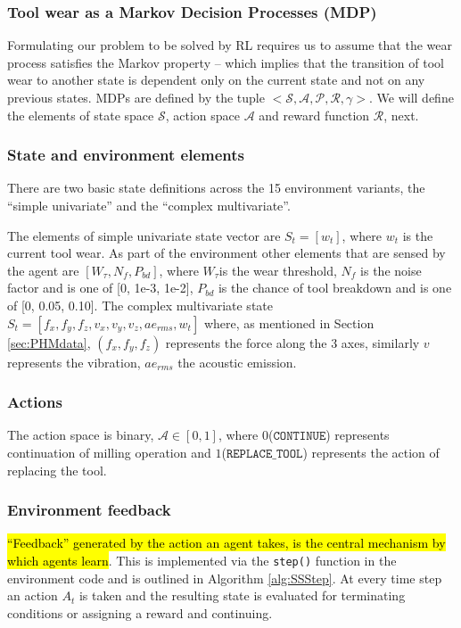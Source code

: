 \documentclass[a4paper, 12pt]{article}
\newcommand{\hlc}[2][cyan!10]{{\colorlet{foo}{#1} \sethlcolor{foo}\hl{#2}}}
\begin{document}
\subsubsection*{Tool wear as a Markov Decision Processes (MDP)}
Formulating our problem to be solved by RL requires us to assume that the wear process satisfies the Markov property -- which implies that the transition of tool wear to another state is dependent only on the current state and not on any previous states. MDPs are defined by the tuple $<\mathcal{S, A, P, R, \gamma}>$. We will define the elements of state space $\mathcal{S}$, action space $\mathcal{A}$ and reward function $\mathcal{R}$, next.

\subsubsection*{State and environment elements}
There are two basic state definitions across the 15 environment variants, the ``simple univariate'' and the ``complex multivariate''. 

The elements of simple univariate state vector are $S_t = [w_t]$, where $w_t$ is the current tool wear. As part of the environment other elements that are sensed by the agent are $[W_\tau, N_f, P_{bd}]$, where $W_\tau$is the wear threshold, $N_f$ is the noise factor and is one of [0, 1e-3, 1e-2], $P_{bd}$ is the chance of tool breakdown and is one of [0, 0.05, 0.10]. The complex multivariate state $S_t = [f_x, f_y, f_z, v_x, v_y, v_z, ae_{rms}, w_t]$ where, as mentioned in Section \ref{sec:PHMdata}, $(f_x, f_y, f_z)$ represents the force along the 3 axes, similarly $v$ represents the vibration, $ae_{rms}$ the acoustic emission.

\subsubsection*{Actions}
The action space is binary, $\mathcal{A} \in [0, 1]$, where $0$($\texttt{CONTINUE}$) represents continuation of milling operation and $1$($\texttt{REPLACE\_TOOL}$) represents the action of replacing the tool.

\subsubsection*{Environment feedback}
\hlc{``Feedback'' generated by the action an agent takes, is the central mechanism by which agents learn}. This is implemented via the \texttt{step()} function in the environment code and is outlined in Algorithm \ref{alg:SSStep}. At every time step an action $A_t$ is taken and the resulting state is evaluated for terminating conditions or assigning a reward and continuing.
\end{document}
